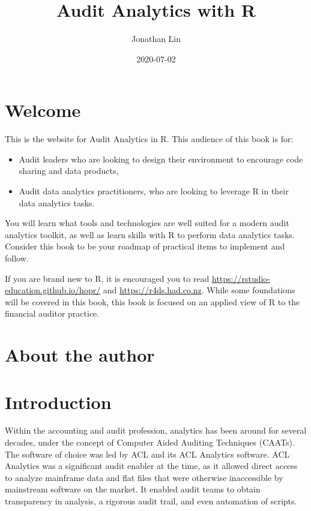 \documentclass[
]{book}
\title{Audit Analytics with R}
\author{Jonathan Lin}
\date{2020-07-02}
\providecommand{\tightlist}{%
  \setlength{\itemsep}{0pt}\setlength{\parskip}{0pt}}
\begin{document}
\maketitle

{
\setcounter{tocdepth}{1}
\tableofcontents
}
\hypertarget{welcome}{%
\chapter*{Welcome}\label{welcome}}

This is the website for Audit Analytics in R. This audience of this book is for:

\begin{itemize}
\tightlist
\item
  Audit leaders who are looking to design their environment to encourage code sharing and data products,
\item
  Audit data analytics practitioners, who are looking to leverage R in their data analytics tasks.
\end{itemize}

You will learn what tools and technologies are well suited for a modern audit analytics toolkit, as well as learn skills with R to perform data analytics tasks. Consider this book to be your roadmap of practical items to implement and follow.

If you are brand new to R, it is encouraged you to read \url{https://rstudio-education.github.io/hopr/} and \url{https://r4ds.had.co.nz}. While some foundations will be covered in this book, this book is focused on an applied view of R to the financial auditor practice.

\hypertarget{about-the-author}{%
\chapter*{About the author}\label{about-the-author}}

\hypertarget{intro}{%
\chapter{Introduction}\label{intro}}

Within the accounting and audit profession, analytics has been around for several decades, under the concept of Computer Aided Auditing Techniques (CAATs). The software of choice was led by ACL and its ACL Analytics software. ACL Analytics was a significant audit enabler at the time, as it allowed direct access to analyze mainframe data and flat files that were otherwise inaccessible by mainstream software on the market. It enabled audit teams to obtain transparency in analysis, a rigorous audit trail, and even automation of scripts.
\end{document}
